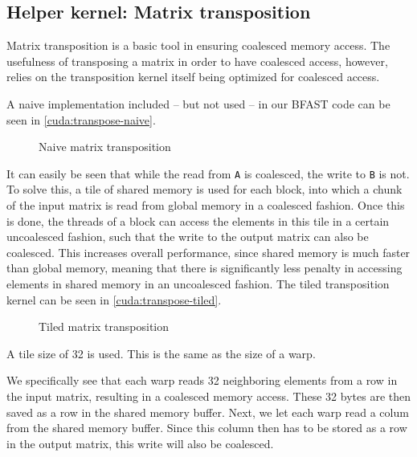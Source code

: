 \subsection{
  Helper kernel: Matrix transposition
}

Matrix transposition is a basic tool in ensuring coalesced memory
access.
The usefulness of transposing a matrix in order to have coalesced access,
however, relies on the transposition kernel itself being optimized for
coalesced access.

A naive implementation included -- but not used -- in our BFAST code can be
seen in \autoref{cuda:transpose-naive}.

\begin{figure}[H]
    \centering
    \caption{Naive matrix transposition}
    \label{cuda:transpose-naive}
\end{figure}

It can easily be seen that while the read from \texttt{A} is coalesced, the
write to \texttt{B} is not.
To solve this, a tile of shared memory is used for each block, into which a
chunk of the input matrix is read from global memory in a coalesced fashion.
Once this is done, the threads of a block can access the elements in this tile
in a certain uncoalesced fashion, such that the write to the output matrix can
also be coalesced.
This increases overall performance, since shared memory is much faster than
global memory, meaning that there is significantly less penalty in accessing
elements in shared memory in an uncoalesced fashion.
The tiled transposition kernel can be seen in \autoref{cuda:transpose-tiled}.

\begin{figure}[H]
    \centering
    \caption{Tiled matrix transposition}
    \label{cuda:transpose-tiled}
\end{figure}
A tile size of 32 is used. This is the same as the size of a warp.

We specifically see that each warp reads 32 neighboring elements from a row in
the input matrix, resulting in a coalesced memory access.
These 32 bytes are then saved as a row in the shared memory buffer.
Next, we let each warp read a colum from the shared memory buffer.
Since this column then has to be stored as a row in the output matrix,
this write will also be coalesced.

